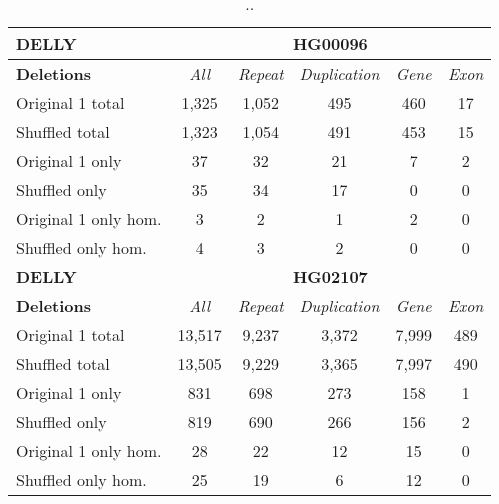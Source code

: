 \begin{table}[htb]
\caption{ .. }
\begin{center}
\begin{tabular}{|l|c||c|c|c|c|}
\hline
{\bf DELLY} & \multicolumn{5}{|c|}{\bf HG00096} \\
\hline
\cline{2-6}
{\bf Deletions} & {\it All} & {\it Repeat} & {\it Duplication} & {\it Gene} & {\it Exon} \\
\hline
Original 1 total & 1,325 & 1,052 & 495 & 460 & 17\\ 
\hline
Shuffled total & 1,323 & 1,054 & 491 & 453 & 15\\ 
\hline
Original 1 only & 37 & 32 & 21 & 7 & 2\\ 
\hline
Shuffled only & 35 & 34 & 17 & 0 & 0\\ 
\hline
Original 1 only hom. & 3 & 2 & 1 & 2 & 0\\ 
\hline
Shuffled only hom. & 4 & 3 & 2 & 0 & 0\\ 
\hline
\hline
{\bf DELLY} & \multicolumn{5}{|c|}{\bf HG02107} \\
\hline
\cline{2-6}
{\bf Deletions} & {\it All} & {\it Repeat} & {\it Duplication} & {\it Gene} & {\it Exon} \\
\hline
Original 1 total & 13,517 & 9,237 & 3,372 & 7,999 & 489\\ 
\hline
Shuffled total & 13,505 & 9,229 & 3,365 & 7,997 & 490\\ 
\hline
Original 1 only & 831 & 698 & 273 & 158 & 1\\ 
\hline
Shuffled only & 819 & 690 & 266 & 156 & 2\\ 
\hline
Original 1 only hom. & 28 & 22 & 12 & 15 & 0\\ 
\hline
Shuffled only hom. & 25 & 19 & 6 & 12 & 0\\ 
\hline
\end{tabular}
\end{center}
\label{tab:orig-vs-shuf-delly-deletions}
\end{table}


